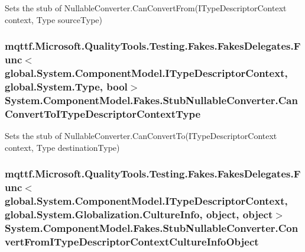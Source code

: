 Sets the stub of Nullable\-Converter.\-Can\-Convert\-From(\-I\-Type\-Descriptor\-Context context, Type source\-Type)

\hypertarget{class_system_1_1_component_model_1_1_fakes_1_1_stub_nullable_converter_a8e1501afc3f7a5d748d773dfed255031}{
\subsubsection[{Can\-Convert\-To\-I\-Type\-Descriptor\-Context\-Type}]{\setlength{\rightskip}{0pt plus 5cm}mqttf.\-Microsoft.\-Quality\-Tools.\-Testing.\-Fakes.\-Fakes\-Delegates.\-Func$<$global.\-System.\-Component\-Model.\-I\-Type\-Descriptor\-Context, global.\-System.\-Type, bool$>$ System.\-Component\-Model.\-Fakes.\-Stub\-Nullable\-Converter.\-Can\-Convert\-To\-I\-Type\-Descriptor\-Context\-Type}}\label{class_system_1_1_component_model_1_1_fakes_1_1_stub_nullable_converter_a8e1501afc3f7a5d748d773dfed255031}


Sets the stub of Nullable\-Converter.\-Can\-Convert\-To(\-I\-Type\-Descriptor\-Context context, Type destination\-Type)

\hypertarget{class_system_1_1_component_model_1_1_fakes_1_1_stub_nullable_converter_ae6af5ee6434c7c4cc96bdafe570c8c47}{
\subsubsection[{Convert\-From\-I\-Type\-Descriptor\-Context\-Culture\-Info\-Object}]{\setlength{\rightskip}{0pt plus 5cm}mqttf.\-Microsoft.\-Quality\-Tools.\-Testing.\-Fakes.\-Fakes\-Delegates.\-Func$<$global.\-System.\-Component\-Model.\-I\-Type\-Descriptor\-Context, global.\-System.\-Globalization.\-Culture\-Info, object, object$>$ System.\-Component\-Model.\-Fakes.\-Stub\-Nullable\-Converter.\-Convert\-From\-I\-Type\-Descriptor\-Context\-Culture\-Info\-Object}}\label{class_system_1_1_component_model_1_1_fakes_1_1_stub_nullable_converter_ae6af5ee6434c7c4cc96bdafe570c8c47}


